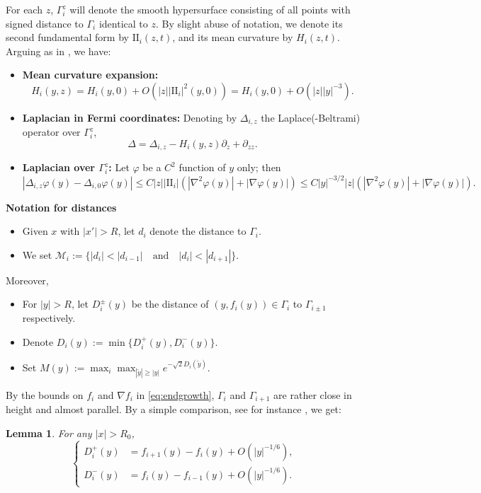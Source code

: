 \documentclass{article}
\newtheorem{lemma}[theorem]{Lemma}
\theoremstyle{definition}
\begin{document}
For each \(z\), \(\Gamma_i^z\) will denote the smooth hypersurface consisting of all points with signed distance to \(\Gamma_i\) identical to \(z\). By slight abuse of notation, we denote its second fundamental form by $\mathrm{II}_i(z,t)$, and its mean curvature by $H_i(z,t)$. Arguing as in \cite[p. 11-13]{WW19}, we have:
\begin{itemize}
    \item {\bf Mean curvature expansion:}
    $$
        H_i(y, z) = H_i(y,0) + O\left(|z||\mathrm{II}_i|^{2}(y,0)\right) = H_i(y,0) + O\left(|z||y|^{-3}\right).
    $$
    \item {\bf Laplacian in Fermi coordinates:} Denoting by \(\Delta_{i,z}\) the Laplace(-Beltrami) operator over \(\Gamma_i^z\),
    \begin{equation*}
    \Delta = \Delta_{i,z} - H_i(y, z)\partial_z + \partial_{zz}.
    \end{equation*}
    \item {\bf Laplacian over $\Gamma_i^z$:} Let $\varphi$ be a $C^2$ function of $y$ only; then
\begin{equation}\label{eq:47t14gtlvag}
|\Delta_{i,z} \varphi(y) - \Delta_{i,0} \varphi(y)| \leq C|z||\mathrm{II}_i|  \left( |\nabla^2 \varphi(y)| + |\nabla \varphi(y)| \right)\leq C |y|^{-3/2} |z| \left( |\nabla^2 \varphi(y)| + |\nabla \varphi(y)| \right).
\end{equation}
\end{itemize}
{\bf Notation for distances}
\begin{itemize}
    \item Given $x$ with $|x'|> R$, let $d_i$ denote the distance to $\Gamma_{i}$.
    \item We set $\mathcal M_i:=\{|d_i|<|d_{i-1}|\quad\mbox{and}\quad |d_i|<|d_{i+1}|\}$.
\end{itemize}
Moreover,
\begin{itemize}
  \item For $|y| > R$, let $D_i^\pm(y)$ be the distance of $(y, f_i(y))\in\Gamma_i$ to $\Gamma_{i\pm 1}$ respectively.
  \item Denote $D_i(y) := \min\{D_i^+(y), D_i^-(y)\}$.
  \item Set $M(y) := \max_{i} \max_{|\widetilde y| \geq |y|} e^{-\sqrt{2} D_i(\widetilde y)}$.
\end{itemize}

By the bounds on $f_i$ and $\nabla f_i$ in \eqref{eq:endgrowth}, $\Gamma_i$ and $\Gamma_{i+1}$ are rather close in height and almost parallel. By a simple comparison, see for instance \cite[Lemma 8.3]{WW18}, we get:
\begin{lemma}\label{lem:82gwgbogg}
For any $|x| > R_0$,
$$
\left\{
\begin{aligned}
D_i^+(y) &= f_{i+1}(y) - f_i(y) + O(|y|^{-1/6}), \\
D_i^-(y) &= f_i(y) - f_{i-1}(y) + O(|y|^{-1/6}).
\end{aligned}
\right.
$$
\end{lemma}
\end{document}
